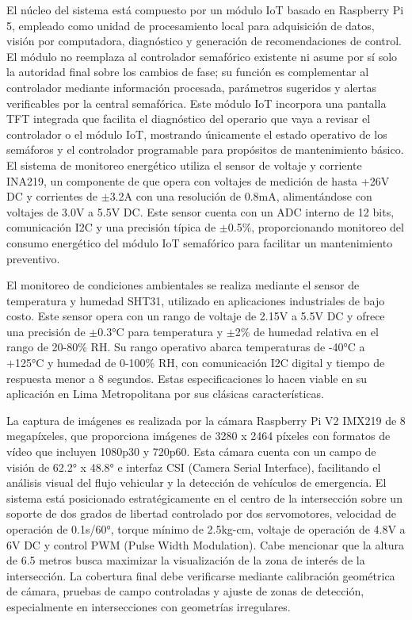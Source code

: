 \documentclass[12pt,a4paper,oneside]{report}
\begin{document}
El núcleo del sistema está compuesto por un módulo IoT basado en Raspberry Pi 5, empleado como unidad de procesamiento local para adquisición de datos, visión por computadora, diagnóstico y generación de recomendaciones de control. El módulo no reemplaza al controlador semafórico existente ni asume por sí solo la autoridad final sobre los cambios de fase; su función es complementar al controlador mediante información procesada, parámetros sugeridos y alertas verificables por la central semafórica. Este módulo IoT incorpora una pantalla TFT integrada que facilita el diagnóstico del operario que vaya a revisar el controlador o el módulo IoT, mostrando únicamente el estado operativo de los semáforos y el controlador programable para propósitos de mantenimiento básico. El sistema de monitoreo energético utiliza el sensor de voltaje y corriente INA219, un componente de que opera con voltajes de medición de hasta +26V DC y corrientes de \ensuremath{\pm}3.2A con una resolución de 0.8mA, alimentándose con voltajes de 3.0V a 5.5V DC. Este sensor cuenta con un ADC interno de 12 bits, comunicación I2C y una precisión típica de \ensuremath{\pm}0.5\%, proporcionando monitoreo del consumo energético del módulo IoT semafórico para facilitar un mantenimiento preventivo.

El monitoreo de condiciones ambientales se realiza mediante el sensor de temperatura y humedad SHT31, utilizado en aplicaciones industriales de bajo costo. Este sensor opera con un rango de voltaje de 2.15V a 5.5V DC y ofrece una precisión de \ensuremath{\pm}0.3°C para temperatura y \ensuremath{\pm}2\% de humedad relativa en el rango de 20-80\% RH. Su rango operativo abarca temperaturas de -40°C a +125°C y humedad de 0-100\% RH, con comunicación I2C digital y tiempo de respuesta menor a 8 segundos. Estas especificaciones lo hacen viable en su aplicación en Lima Metropolitana por sus clásicas características.

La captura de imágenes es realizada por la cámara Raspberry Pi V2 IMX219 de 8 megapíxeles, que proporciona imágenes de 3280 x 2464 píxeles con formatos de vídeo que incluyen 1080p30 y 720p60. Esta cámara cuenta con un campo de visión de 62.2° x 48.8° e interfaz CSI (Camera Serial Interface), facilitando el análisis visual del flujo vehicular y la detección de vehículos de emergencia. El sistema está posicionado estratégicamente en el centro de la intersección sobre un soporte de dos grados de libertad controlado por dos servomotores, velocidad de operación de 0.1s/60°, torque mínimo de 2.5kg-cm, voltaje de operación de 4.8V a 6V DC y control PWM (Pulse Width Modulation). Cabe mencionar que la altura de 6.5 metros busca maximizar la visualización de la zona de interés de la intersección. La cobertura final debe verificarse mediante calibración geométrica de cámara, pruebas de campo controladas y ajuste de zonas de detección, especialmente en intersecciones con geometrías irregulares.
\end{document}
